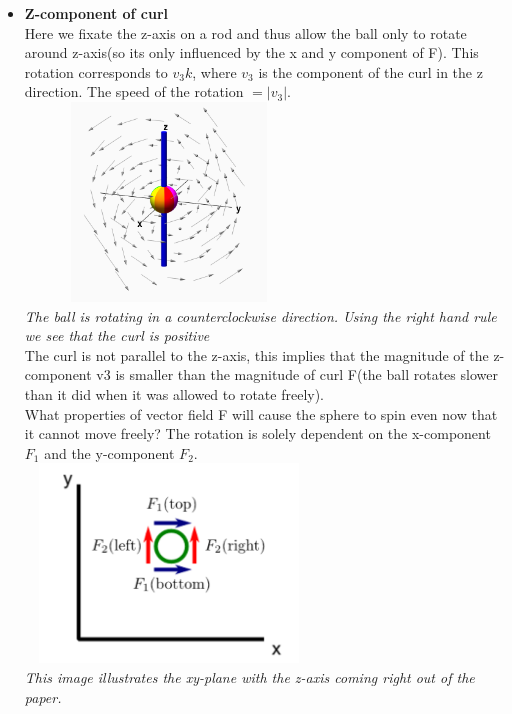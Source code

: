 \documentclass[12pt,a4paper]{article}
\begin{document}
\begin{itemize}
		\item \textbf{Z-component of curl}\\
		Here we fixate the z-axis on a rod and thus allow the ball only to rotate around z-axis(so its only influenced by the x and y component of F). This rotation corresponds to $v_3k$, where $v_3$ is the component of the curl in the z direction. The speed of the rotation $ = |v_3|.$ 
		\includegraphics[width=0.6\textwidth, height = 200px]{z-component.png}\\
		\textit{The ball is rotating in a counterclockwise direction. Using the right hand rule we see that the curl is positive}\\
		
		The curl is not parallel to the z-axis, this implies that the magnitude of the z-component v3 is smaller than the magnitude of curl F(the ball rotates slower than it did when it was allowed to rotate freely). \\
		What properties of vector field F will cause the sphere to spin even now that it cannot move freely? The rotation is solely dependent on the x-component $F_1$ and the y-component $F_2$. \\
		\includegraphics[width=0.6\textwidth, height = 200px]{xy-plane.png}\\
		\textit{This image illustrates the xy-plane with the z-axis coming right out of the paper.}\\
		

\end{itemize}
\end{document}
